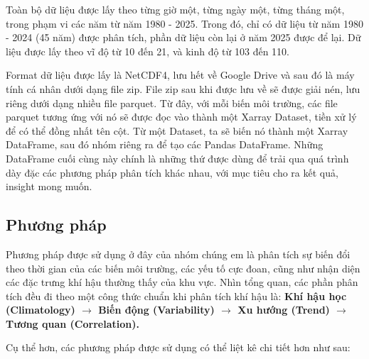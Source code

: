 \documentclass[12pt,a4paper]{article}
\begin{document}
Toàn bộ dữ liệu được lấy theo từng giờ một, từng ngày một, từng tháng một, trong phạm vi các năm từ năm 1980 - 2025. Trong đó, chỉ có dữ liệu từ năm 1980 - 2024 (45 năm) được phân tích, phần dữ liệu còn lại ở năm 2025 được để lại. Dữ liệu được lấy theo vĩ độ từ 10 đến 21, và kinh độ từ 103 đến 110.

Format dữ liệu được lấy là NetCDF4, lưu hết về Google Drive và sau đó là máy tính cá nhân dưới dạng file zip. File zip sau khi được lưu về sẽ được giải nén, lưu riêng dưới dạng nhiều file parquet. Từ đây, với mỗi biến môi trường, các file parquet tương ứng với nó sẽ được đọc vào thành một Xarray Dataset, tiền xử lý để có thể đồng nhất tên cột. Từ một Dataset, ta sẽ biến nó thành một Xarray DataFrame, sau đó nhóm riêng ra để tạo các Pandas DataFrame. Những DataFrame cuối cùng này chính là những thứ được dùng để trải qua quá trình dày đặc các phương pháp phân tích khác nhau, với mục tiêu cho ra kết quả, insight mong muốn. 

\subsection{Phương pháp}

Phương pháp được sử dụng ở đây của nhóm chúng em là phân tích sự biến đổi theo thời gian của các biến môi trường, các yếu tố cực đoan, cũng như nhận diện các đặc trưng khí hậu thường thấy của khu vực. Nhìn tổng quan, các phần phân tích đều đi theo một công thức chuẩn khi phân tích khí hậu là:\newline
\textbf{Khí hậu học (Climatology) $\rightarrow$ Biến động (Variability) $\rightarrow$ Xu hướng (Trend) $\rightarrow$ Tương quan (Correlation). }

Cụ thể hơn, các phương pháp được sử dụng có thể liệt kê chi tiết hơn như sau:
\end{document}
